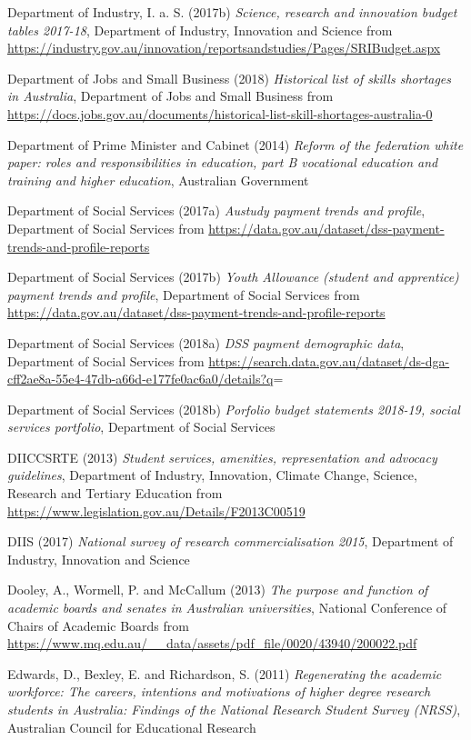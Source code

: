 \documentclass[]{book}
\begin{document}
\protect\hypertarget{_ENREF_102}{}{}Department of Industry, I. a. S. (2017b) \emph{Science, research and innovation budget tables 2017-18}, Department of Industry, Innovation and Science from \url{https://industry.gov.au/innovation/reportsandstudies/Pages/SRIBudget.aspx}

\protect\hypertarget{_ENREF_103}{}{}Department of Jobs and Small Business (2018) \emph{Historical list of skills shortages in Australia}, Department of Jobs and Small Business from \url{https://docs.jobs.gov.au/documents/historical-list-skill-shortages-australia-0}

Department of Prime Minister and Cabinet (2014) \emph{Reform of the federation white paper: roles and responsibilities in education, part B vocational education and training and higher education}, Australian Government

Department of Social Services (2017a) \emph{Austudy payment trends and profile}, Department of Social Services from \url{https://data.gov.au/dataset/dss-payment-trends-and-profile-reports}

Department of Social Services (2017b) \emph{Youth Allowance (student and apprentice) payment trends and profile}, Department of Social Services from \url{https://data.gov.au/dataset/dss-payment-trends-and-profile-reports}

Department of Social Services (2018a) \emph{DSS payment demographic data}, Department of Social Services from \url{https://search.data.gov.au/dataset/ds-dga-cff2ae8a-55e4-47db-a66d-e177fe0ac6a0/details?q}{=}

\protect\hypertarget{_ENREF_108}{}{}Department of Social Services (2018b) \emph{Porfolio budget statements 2018-19, social services portfolio}, Department of Social Services

DIICCSRTE (2013) \emph{Student services, amenities, representation and advocacy guidelines}, Department of Industry, Innovation, Climate Change, Science, Research and Tertiary Education from \url{https://www.legislation.gov.au/Details/F2013C00519}

DIIS (2017) \emph{National survey of research commercialisation 2015}, Department of Industry, Innovation and Science

Dooley, A., Wormell, P. and McCallum (2013) \emph{The purpose and function of academic boards and senates in Australian universities}, National Conference of Chairs of Academic Boards from \url{https://www.mq.edu.au/__data/assets/pdf_file/0020/43940/200022.pdf}

Edwards, D., Bexley, E. and Richardson, S. (2011) \emph{Regenerating the academic workforce: The careers, intentions and motivations of higher degree research students in Australia: Findings of the National Research Student Survey (NRSS)}, Australian Council for Educational Research
\end{document}
